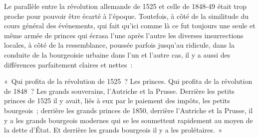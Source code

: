 \documentclass[french,twoside]{book} %
\newenvironment{quoteblock}%
  {\begin{quoting}}
  {\end{quoting}}
\newenvironment{quotebar}{%
    \def\FrameCommand{{\color{rubric!10!}\vrule width 0.5em} \hspace{0.9em}}%
    \def\OuterFrameSep{\itemsep} %
    \MakeFramed {\advance\hsize-\width \FrameRestore}
  }%
  {%
    \endMakeFramed
  }
\renewenvironment{quoteblock}%
  {%
    \savenotes
    \setstretch{0.9}
    \begin{quotebar}
  }
  {%
    \end{quotebar}
    \spewnotes
  }
\begin{document}
Le parallèle entre la révolution allemande de 1525 et celle de 1848-49 était trop proche pour pouvoir être écarté à l’époque. Toutefois, à côté de la similitude du cours général des événements, qui fait qu’ici comme là ce fut toujours une seule et même armée de princes qui écrasa l’une après l’autre les diverses insurrections locales, à côté de la ressemblance, poussée parfois jusqu’au ridicule, dans la conduite de la bourgeoisie urbaine dans l’un et l’autre cas, il y a aussi des différences parfaitement claires et nettes :\par

\begin{quoteblock}
 \noindent « Qui profita de la révolution de 1525 ? Les princes. Qui profita de la révolution de 1848 ? Les grands souverains, l’Autriche et la Prusse. Derrière les petits princes de 1525 il y avait, liés à eux par le paiement des impôts, les petits bourgeois ; derrière les grands princes de 1850, derrière l’Autriche et la Prusse, il y a les grands bourgeois modernes qui se les soumettent rapidement au moyen de la dette d’État. Et derrière les grands bourgeois il y a les prolétaires. »
\end{quoteblock}
\end{document}
